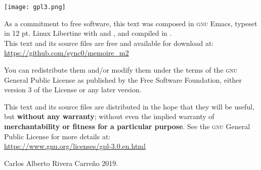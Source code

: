 \newpage
\begin{center}
\vspace*{\fill}
\noindent
\texttt{[image: gpl3.png]}\par
\vspace{1\baselineskip}

As a commitment to free software, this text was composed in \textsc{gnu}
Emacs, typeset in 12 pt. Linux Libertine with \hologo{\fmtname}
and \KOMAScript, and compiled in .\\
\vspace{1\baselineskip}
This text and its source files are free and available for download at:\\
\vspace{1\baselineskip}
\url{https://github.com/sync0/memoire_m2}
\vspace{1\baselineskip}

\noindent You can redistribute them and/or modify them under the terms of
the \textsc{gnu} General Public License as published by the Free Software
Foundation, either version 3 of the License or any later version.

This text and its source files are distributed in the hope that they will
be useful, but \textbf{without any warranty}; without even the implied
warranty of \textbf{merchantability or fitness for a particular purpose}.
See the \textsc{gnu} General Public License for more details at:\\ 
\vspace{1\baselineskip}
\url{https://www.gnu.org/licenses/gpl-3.0.en.html} 

\vspace{1\baselineskip}
\noindent
\textcopyright Carlos Alberto Rivera Carreño 2019.
\end{center}




\newpage 


\newpage
\tableofcontents 